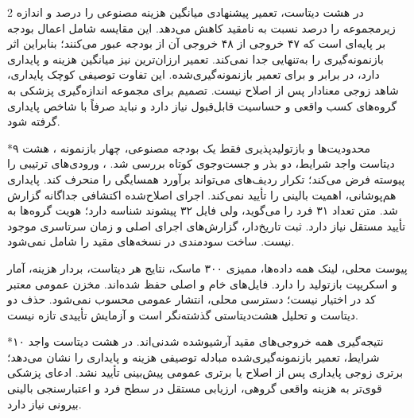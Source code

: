 \documentclass[10pt,a4paper]{article}
\makeatletter
\renewcommand{\section}{\@startsection{section}{1}{0pt}{5pt}{2pt}{\normalfont\normalsize\bfseries}}
\newcommand{\sect}[1]{\section*{#1}}
\makeatother
\begin{document}
\begin{multicols}{2}
در هشت دیتاست، تعمیر پیشنهادی میانگین هزینه مصنوعی را  درصد و اندازه زیرمجموعه را  درصد نسبت به  نامقید کاهش می‌دهد. این مقایسه شامل اعمال بودجه بر پایه‌ای است که ۴۷ خروجی از ۴۸ خروجی آن از بودجه عبور می‌کنند؛ بنابراین اثر بازنمونه‌گیری را به‌تنهایی جدا نمی‌کند. تعمیر ارزان‌ترین نیز میانگین هزینه  و پایداری  دارد، در برابر  و  برای تعمیر بازنمونه‌گیری‌شده. این تفاوت توصیفی کوچک پایداری، شاهد زوجی معنادار پس از اصلاح نیست. تصمیم برای مجموعه اندازه‌گیری پزشکی به گروه‌های کسب واقعی و حساسیت قابل‌قبول نیاز دارد و نباید صرفاً با شاخص پایداری گرفته شود.

\sect{۹  محدودیت‌ها و بازتولیدپذیری}
فقط یک بودجه مصنوعی، چهار بازنمونه ، هشت دیتاست واجد شرایط، دو بذر و جست‌وجوی کوتاه بررسی شد. ، ورودی‌های ترتیبی  را پیوسته فرض می‌کند؛ تکرار ردیف‌های  می‌تواند برآورد همسایگی  را منحرف کند. پایداری هم‌پوشانی، اهمیت بالینی را تأیید نمی‌کند. اجرای اصلاح‌شده اکتشافی جداگانه گزارش شد. متن  تعداد ۳۱ فرد را می‌گوید، ولی فایل ۳۲ پیشوند شناسه دارد؛ هویت گروه‌ها به تأیید مستقل نیاز دارد. ثبت تاریخ‌دار، گزارش‌های اجرای اصلی و زمان سرتاسری موجود نیست.  ساخت سودمندی  در نسخه‌های مقید را شامل نمی‌شود.

پیوست محلی، لینک همه داده‌ها، ممیزی ۳۰۰ ماسک، نتایج هر دیتاست، بردار هزینه، آمار و اسکریپت بازتولید را دارد. فایل‌های خام و اصلی حفظ شده‌اند. مخزن عمومی معتبر کد در اختیار نیست؛ دسترسی محلی، انتشار عمومی محسوب نمی‌شود. حذف دو دیتاست و تحلیل هشت‌دیتاستی گذشته‌نگر است و آزمایش تأییدی تازه نیست.

\sect{۱۰  نتیجه‌گیری}
همه خروجی‌های مقید آرشیوشده شدنی‌اند. در هشت دیتاست واجد شرایط، تعمیر بازنمونه‌گیری‌شده مبادله توصیفی هزینه و پایداری را نشان می‌دهد؛ برتری زوجی پایداری پس از اصلاح یا برتری عمومی پیش‌بینی تأیید نشد. ادعای پزشکی قوی‌تر به هزینه واقعی گروهی، ارزیابی مستقل در سطح فرد و اعتبارسنجی بالینی بیرونی نیاز دارد.


\end{multicols}
\end{document}
